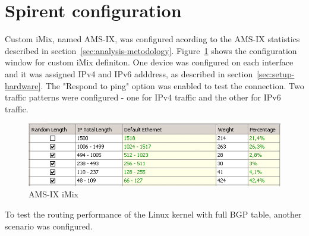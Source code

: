 
\section{Spirent configuration}
Custom iMix, named AMS-IX, was configured acording to the AMS-IX statistics described in section~\ref{sec:analysis-metodology}.
Figure~\ref{fig:setup-amsix-imix} shows the configuration window for custom iMix definiton.
One device was configured on each interface and it was assigned IPv4 and IPv6 adddress, as described in section~\ref{sec:setup-hardware}.
The "Respond to ping" option was enabled to test the connection.
Two traffic patterns were configured - one for IPv4 traffic and the other for IPv6 traffic. %
\begin{figure}
	\centering
	\includegraphics[width=14.5cm,keepaspectratio]{fig/amsix-imix.png}
	\caption{AMS-IX iMix}
	\label{fig:setup-amsix-imix}
\end{figure}

To test the routing performance of the Linux kernel with full BGP table, 
another scenario was configured.%
